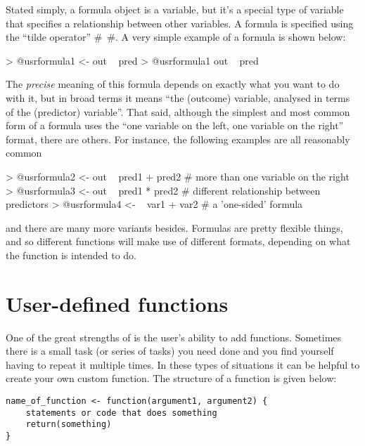 Stated simply, a formula object is a variable, but it's a special type of variable that specifies a relationship between other variables. A formula is specified using the ``tilde operator'' \rtextverb#~#. A very simple example of a formula is shown below:
\begin{rblock1}
> @usr{formula1 <- out ~ pred}
> @usr{formula1}
out ~ pred
\end{rblock1}
The {\it precise} meaning of this formula depends on exactly what you want to do with it, but in broad terms it means ``the  (outcome) variable, analysed in terms of the  (predictor) variable''. That said, although the simplest and most common form of a formula uses the  ``one variable on the left, one variable on the right'' format, there are others. For instance, the following examples are all reasonably common
\begin{rblock1}
> @usr{formula2 <-  out ~ pred1 + pred2}   # more than one variable on the right
> @usr{formula3 <-  out ~ pred1 * pred2}   # different relationship between predictors 
> @usr{formula4 <-  ~ var1 + var2}         # a 'one-sided' formula
\end{rblock1}
and there are many more variants besides. Formulas are pretty flexible things, and so different functions will make use of different formats, depending on what the function is intended to do.



\section{User-defined functions}\label{sec:generics}

One of the great strengths of \R is the user's ability to add functions. Sometimes there is a small task (or series of tasks) you need done and you find yourself having to repeat it multiple times. In these types of situations it can be helpful to create your own custom function. The structure of a function is given below:

\begin{verbatim}
name_of_function <- function(argument1, argument2) {
    statements or code that does something
    return(something)
}
\end{verbatim}

